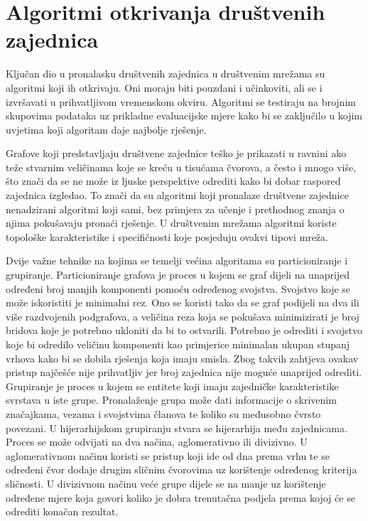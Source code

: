 \chapter{Algoritmi otkrivanja društvenih zajednica}

Ključan dio u pronalasku društvenih zajednica u društvenim mrežama su algoritmi koji ih otkrivaju. Oni moraju biti pouzdani i učinkoviti, ali se i izvršavati u prihvatljivom vremenskom okviru. Algoritmi se testiraju na brojnim skupovima podataka uz prikladne evaluacijske mjere kako bi se zaključilo u kojim uvjetima koji algoritam daje najbolje rješenje. 

Grafove koji predstavljaju društvene zajednice teško je prikazati u ravnini ako teže stvarnim veličinama koje se kreću u tisućama čvorova, a često i mnogo više, što znači da se ne može iz ljuske perspektive odrediti kako bi dobar raspored zajednica izgledao. To znači da su algoritmi koji pronalaze društvene zajednice nenadzirani algoritmi koji sami, bez primjera za učenje i prethodnog znanja o njima pokušavaju pronaći rješenje. U društvenim mrežama algoritmi koriste topološke karakteristike i specifičnosti koje posjeduju ovakvi tipovi mreža. 

Dvije važne tehnike na kojima se temelji većina algoritama su particioniranje i grupiranje. Particioniranje grafova je proces u kojem se graf dijeli na unaprijed određeni broj manjih komponenti pomoću određenog svojstva. Svojstvo koje se može iskoristiti je minimalni rez. Ono se koristi tako da se graf podijeli na dva ili više razdvojenih podgrafova, a veličina reza koja se pokušava minimizirati je broj bridova koje je potrebno ukloniti da bi to ostvarili. Potrebno je odrediti i svojstvo koje bi odredilo veličinu komponenti kao primjerice minimalan ukupan stupanj vrhova kako bi se dobila rješenja koja imaju smisla. Zbog takvih zahtjeva ovakav pristup najčešće nije prihvatljiv jer broj zajednica nije moguće unaprijed odrediti.
Grupiranje je proces u kojem se entitete koji imaju zajedničke karakteristike svrstava u iste grupe. Pronalaženje grupa može dati informacije o skrivenim značajkama, vezama i svojstvima članova te koliko su međusobno čvrsto povezani. U hijerarhijskom grupiranju stvara se hijerarhija među zajednicama. Proces se može odvijati na dva načina, aglomerativno ili divizivno. U aglomerativnom načinu koristi se pristup koji ide od dna prema vrhu te se određeni čvor dodaje drugim sličnim čvorovima uz korištenje određenog kriterija sličnosti. U divizivnom načinu veće grupe dijele se na manje uz korištenje određene mjere koja govori koliko je dobra trenutačna podjela prema kojoj će se odrediti konačan rezultat.



